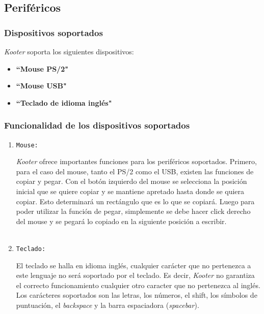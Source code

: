 \documentclass[a4paper,11pt]{article}
\begin{document}
\subsection{Periféricos}
\subsubsection{Dispositivos soportados}
\emph{Kooter} soporta los siguientes dispositivos:
\begin{itemize}
	\item \textbf{``Mouse PS/2"} 
	\item \textbf{``Mouse USB"} 
	\item \textbf{``Teclado de idioma inglés"}
\end{itemize}
\subsubsection{Funcionalidad de los dispositivos soportados}
\begin{enumerate}
	\item \begin{large}\texttt{Mouse:} \end{large}
\emph{Kooter} ofrece importantes funciones para los periféricos soportados. Primero, para el caso del mouse, tanto el PS/2 como el USB, existen las funciones de copiar y pegar. Con el botón izquierdo del mouse se selecciona la posición inicial que se quiere copiar y se mantiene apretado hasta donde se quiera copiar. Esto determinará un rectángulo que es lo que se copiará. Luego para poder utilizar la función de pegar, simplemente se debe hacer click derecho del mouse y se pegará lo copiado en la siguiente posición a escribir.
\ \
\\
\\

	\item \begin{large}\texttt{Teclado:} \end{large}
El teclado se halla en idioma inglés, cualquier carácter que no pertenezca a este lenguaje no será soportado por el teclado. Es decir, \emph{Kooter} no garantiza el correcto funcionamiento cualquier otro caracter que no pertenezca al inglés. Los carácteres soportados son las letras, los números, el shift, los símbolos de puntuación, el \emph{backspace} y la barra espaciadora (\emph{spacebar}).
\end{enumerate}
\end{document}
